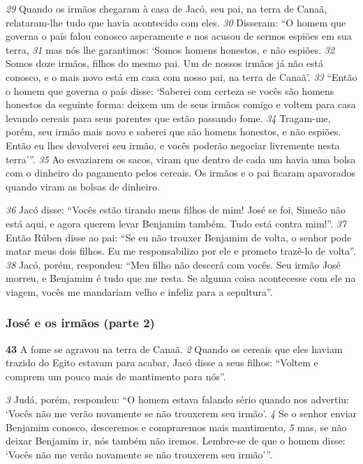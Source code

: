 \bigskip   
\textit{\tiny 29}
Quando os irmãos chegaram à casa de Jacó, seu pai, na terra de Canaã,
relataram-lhe tudo que havia acontecido com eles. 
\textit{\tiny 30}
Disseram: “O homem que
governa o país falou conosco asperamente e nos acusou de sermos espiões em sua
terra, 
\textit{\tiny 31}
mas nós lhe garantimos: ‘Somos homens honestos, e não espiões.
\textit{\tiny 32}
Somos doze irmãos, filhos do mesmo pai. Um de nossos irmãos já não está
conosco, e o mais novo está em casa com nosso pai, na terra de Canaã’.
\textit{\tiny 33}
“Então o homem que governa o país disse: ‘Saberei com certeza se vocês são
homens honestos da seguinte forma: deixem um de seus irmãos comigo e voltem
para casa levando cereais para seus parentes que estão passando fome. 
\textit{\tiny 34}
Tragam-me, porém, seu irmão mais novo e saberei que são homens honestos, e não
espiões. Então eu lhes devolverei seu irmão, e vocês poderão negociar livremente
nesta terra’”.
\textit{\tiny 35}
Ao esvaziarem os sacos, viram que dentro de cada um havia uma bolsa com o
dinheiro do pagamento pelos cereais. Os irmãos e o pai ficaram apavorados
quando viram as bolsas de dinheiro. 

\bigskip   
\textit{\tiny 36}
Jacó disse: “Vocês estão tirando meus
filhos de mim! José se foi, Simeão não está aqui, e agora querem levar Benjamim
também. Tudo está contra mim!”.
\textit{\tiny 37}
Então Rúben disse ao pai: “Se eu não trouxer Benjamim de volta, o senhor
pode matar meus dois filhos. Eu me responsabilizo por ele e prometo trazê-lo de
volta”.
\textit{\tiny 38}
Jacó, porém, respondeu: “Meu filho não descerá com vocês. Seu irmão José
morreu, e Benjamim é tudo que me resta. Se alguma coisa acontecesse com ele na
viagem, vocês me mandariam velho e infeliz para a sepultura”.

\bigskip
\subsubsection*{José e os irmãos (parte 2)}
\textbf{\large 43}
 A fome se agravou na terra de Canaã. 
\textit{\tiny 2} 
Quando os cereais que eles haviam
trazido do Egito estavam para acabar, Jacó disse a seus filhos: “Voltem e comprem
um pouco mais de mantimento para nós”. 

\bigskip
\textit{\tiny 3}
Judá, porém, respondeu: “O homem estava falando sério quando nos advertiu:
‘Vocês não me verão novamente se não trouxerem seu irmão’. 
\textit{\tiny 4} 
Se o senhor enviar
Benjamim conosco, desceremos e compraremos mais mantimento, 
\textit{\tiny 5} 
mas, se não
deixar Benjamim ir, nós também não iremos. Lembre-se de que o homem disse:
‘Vocês não me verão novamente se não trouxerem seu irmão’”. 


